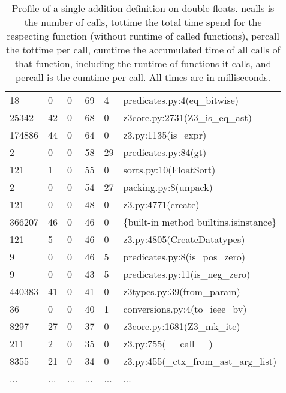 \documentclass[a4paper,UKenglish,cleveref, autoref, thm-restate]{lipics-v2019}
\begin{document}
\begin{table}[]
\begin{tabular}{lllll|l}
		18      & 0       & 0       & 69      & 4       & predicates.py:4(eq\_bitwise)                                   \\
		25342   & 42      & 0       & 68      & 0       & z3core.py:2731(Z3\_is\_eq\_ast)                                \\
		174886  & 44      & 0       & 64      & 0       & z3.py:1135(is\_expr)                                           \\
		2       & 0       & 0       & 58      & 29      & predicates.py:84(gt)                                           \\
		121     & 1       & 0       & 55      & 0       & sorts.py:10(FloatSort)                                         \\
		2       & 0       & 0       & 54      & 27      & packing.py:8(unpack)                                           \\
		121     & 0       & 0       & 48      & 0       & z3.py:4771(create)                                             \\
		366207  & 46      & 0       & 46      & 0       & \{built-in method builtins.isinstance\}                        \\
		121     & 5       & 0       & 46      & 0       & z3.py:4805(CreateDatatypes)                                    \\
		9       & 0       & 0       & 46      & 5       & predicates.py:8(is\_pos\_zero)                                 \\
		9       & 0       & 0       & 43      & 5       & predicates.py:11(is\_neg\_zero)                                \\
		440383  & 41      & 0       & 41      & 0       & z3types.py:39(from\_param)                                     \\
		36      & 0       & 0       & 40      & 1       & conversions.py:4(to\_ieee\_bv)                                 \\
		8297    & 27      & 0       & 37      & 0       & z3core.py:1681(Z3\_mk\_ite)                                    \\
		211     & 2       & 0       & 35      & 0       & z3.py:755(\_\_call\_\_)                                        \\
		8355    & 21      & 0       & 34      & 0       & z3.py:455(\_ctx\_from\_ast\_arg\_list)                         \\
		...	    &...     & ... & ... &... & ...   
	\end{tabular}
	\caption{Profile of a single addition definition on double floats. ncalls is the number of calls, tottime the total time spend for the respecting function (without runtime of called functions), percall the tottime per call, cumtime the accumulated time of all calls of that function, including the runtime of functions it calls, and percall is the cumtime per call. All times are in milliseconds.}
	\label{tab:singleadditiondefinition}
\end{table}
\end{document}
